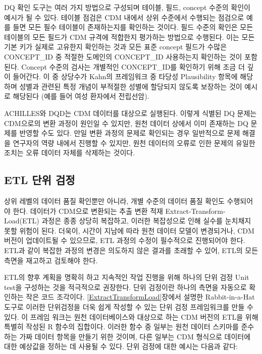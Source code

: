 \documentclass[10.5pt]{book}
\theoremstyle{definition}
\theoremstyle{definition}
\theoremstyle{definition}
\theoremstyle{remark}
\let\BeginKnitrBlock\begin \let\EndKnitrBlock\end
\begin{document}
DQ 확인 도구는 여러 가지 방법으로 구성되며 테이블, 필드, concept 수준의
확인이 예시가 될 수 있다. 테이블 점검은 CDM 내에서 상위 수준에서
수행되는 점검으로 예를 들면 모든 필수 테이블이 존재하는지를 확인하는
것이다. 필드 수준의 확인은 모든 테이블의 모든 필드가 CDM 규격에 적합한지
평가하는 방법으로 수행된다. 이는 모든 기본 키가 실제로 고유한지 확인하는
것과 모든 표준 concept 필드가 수많은 CONCEPT\_ID 중 적절한 도메인의
CONCEPT\_ID 사용하는지 확인하는 것이 포함된다. Concept 수준의 검사는
개별적인 CONCEPT\_ID를 확인하기 위해 조금 더 깊이 들어간다. 이 중
상당수가 Kahn의 프레임워크 중 타당성 Plausibility 항목에 해당하며 성별과
관련된 특정 개념이 부적절한 성별에 할당되지 않도록 보장하는 것이 예시로
해당된다 (예를 들어 여성 환자에서 전립선암).

\BeginKnitrBlock{rmdimportant}
ACHILLES와 DQD는 CDM 데이터를 대상으로 실행된다. 이렇게 식별된 DQ 문제는
CDM으로의 변환 과정이 원인일 수 있지만, 원천 데이터 상에서 이미 존재하는
DQ 문제를 반영할 수도 있다. 만일 변환 과정의 문제로 확인되는 경우
일반적으로 문제 해결을 연구자의 역량 내에서 진행할 수 있지만, 원천
데이터의 오류로 인한 문제의 유일한 조치는 오류 데이터 자체를 삭제하는
것이다.
\EndKnitrBlock{rmdimportant}

\subsection{ETL 단위 검정}\label{etlUnitTests}


상위 레벨의 데이터 품질 확인뿐만 아니라, 개별 수준의 데이터 품질 확인도
수행되어야 한다. 데이터가 CDM으로 변환되는 추출 변환 적재
Extract-Transform-Load(ETL) 과정은 종종 상당히 복잡하고, 이러한
복잡성으로 인해 실수를 눈치채지 못할 위험이 된다. 더욱이, 시간이 지남에
따라 원천 데이터 모델이 변경되거나, CDM 버전이 업데이트될 수 있으므로,
ETL 과정의 수정이 필수적으로 진행되어야 한다. ETL과 같이 복잡한 과정의
변경은 의도하지 않은 결과를 초래할 수 있어, ETL의 모든 측면을 재고하고
검토해야 한다.

ETL의 향후 계획을 명확히 하고 지속적인 작업 진행을 위해 하나의 단위 검정
Unit test을 구성하는 것을 적극적으로 권장한다. 단위 검정이란 하나의
측면을 자동으로 확인하는 작은 코드 조각이다.
\ref{ExtractTransformLoad}장에서 설명한 Rabbit-in-a-Hat 도구로 이러한
단위검정을 더욱 쉽게 작성할 수 있는 단위 검정 프레임워크를 만들 수 있다.
이 프레임 워크는 원천 데이터베이스와 대상으로 하는 CDM 버전의 ETL을 위해
특별히 작성된 R 함수의 집합이다. 이러한 함수 중 일부는 원천 데이터
스키마를 준수하는 가짜 데이터 항목을 만들기 위한 것이며, 다른 일부는 CDM
형식으로 데이터에 대한 예상값을 정하는 데 사용될 수 있다. 단위 검정에
대한 예시는 다음과 같다:
\end{document}
